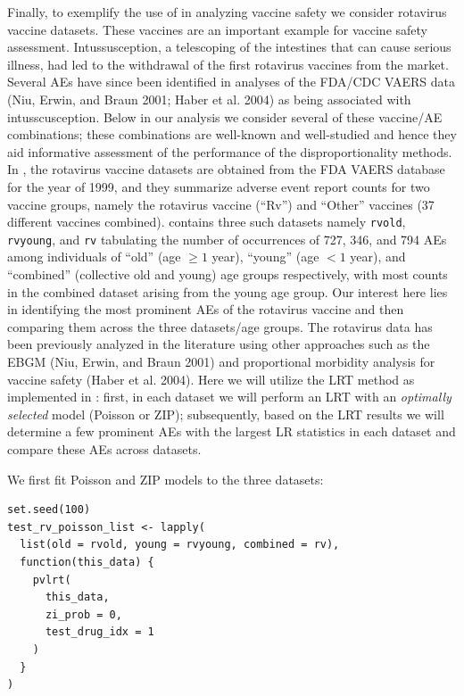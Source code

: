 Finally, to exemplify the use of  in analyzing vaccine safety we consider rotavirus vaccine datasets. These vaccines are an important example for vaccine safety assessment. Intussusception, a telescoping of the intestines that can cause serious illness, had led to the withdrawal of the first rotavirus vaccines from the market. Several AEs have since been identified in analyses of the FDA/CDC VAERS data (Niu, Erwin, and Braun 2001; Haber et al. 2004) as being associated with intusscusception. Below in our analysis we consider several of these vaccine/AE combinations; these combinations are well-known and well-studied and hence they aid informative assessment of the performance of the disproportionality methods. In , the rotavirus vaccine datasets are obtained from the FDA VAERS database for the year of 1999, and they summarize adverse event report counts for two vaccine groups, namely the rotavirus vaccine (``Rv'') and ``Other'' vaccines (37 different vaccines combined).  contains three such datasets namely \texttt{rvold}, \texttt{rvyoung}, and \texttt{rv} tabulating the number of occurrences of 727, 346, and 794 AEs among individuals of ``old'' (age \(\geq 1\) year), ``young'' (age \(< 1\) year), and ``combined'' (collective old and young) age groups respectively, with most counts in the combined dataset arising from the young age group. Our interest here lies in identifying the most prominent AEs of the rotavirus vaccine and then comparing them across the three datasets/age groups. The rotavirus data has been previously analyzed in the literature using other approaches such as the EBGM (Niu, Erwin, and Braun 2001) and proportional morbidity analysis for vaccine safety (Haber et al. 2004). Here we will utilize the LRT method as implemented in : first, in each dataset we will perform an LRT with an \emph{optimally selected} model (Poisson or ZIP); subsequently, based on the LRT results we will determine a few prominent AEs with the largest LR statistics in each dataset and compare these AEs across datasets.

\noindent We first fit Poisson and ZIP models to the three datasets:

\begin{verbatim}
set.seed(100)
test_rv_poisson_list <- lapply(
  list(old = rvold, young = rvyoung, combined = rv),
  function(this_data) {
    pvlrt(
      this_data,
      zi_prob = 0,
      test_drug_idx = 1
    )
  }
)
\end{verbatim}

